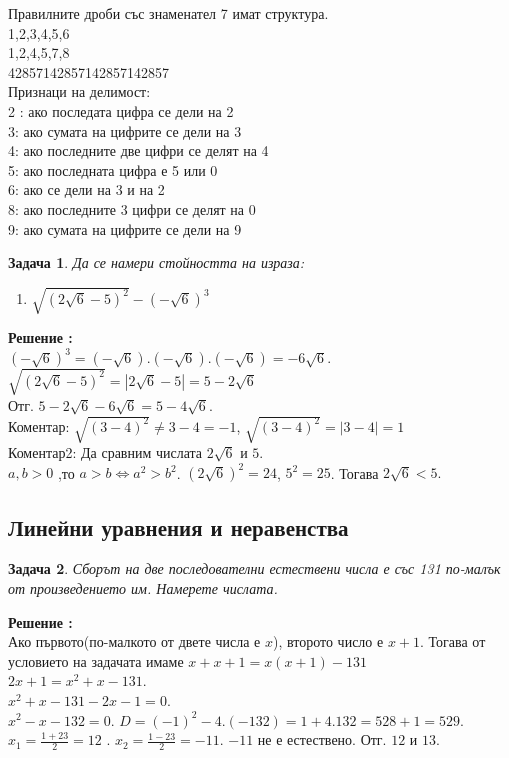 \documentclass{article}
\newtheorem{problem}{Задача}
\newcounter{solution}
\newcommand\solution{%
	\stepcounter{solution}%
	\textbf{Решение :}\\%
}
\begin{document}
\noindent
Правилните дроби със знаменател 7 имат структура. \\
1,2,3,4,5,6\\
1,2,4,5,7,8 \\
42857142857142857142857 \\
      
 
 Признаци на делимост:\\
 2 : ако последата цифра се дели на 2 \\
  3: ако сумата на цифрите се дели на 3 \\
 4: ако последните две цифри се делят на 4 \\
 5: ако последната цифра е 5 или 0 \\
 6: ако се дели на 3 и на 2 \\
 8: ако последните 3 цифри се делят на 0 \\
 9: ако сумата на цифрите се дели на 9
 \vspace{2cm}
 
\begin{problem}
Да се намери стойността на израза:
\begin{enumerate}
	\item $\sqrt{(2\sqrt{6} - 5 )^2} - (-\sqrt{6})^3$
\end{enumerate}	
\end{problem}
\solution

$ (-\sqrt{6})^3 =(-\sqrt{6}).(-\sqrt{6}).(-\sqrt{6}) = -6\sqrt{6}. $ \\
$\sqrt{(2\sqrt{6} - 5 )^2} = | 2\sqrt{6} - 5 | = 5 - 2\sqrt6$ \\
Отг. $ 5 - 2\sqrt 6 - 6\sqrt{6} = 5 - 4\sqrt{6} $. \\
Коментар: $\sqrt{(3-4)^2} \neq 3-4 = -1 $, $\sqrt{(3-4)^2} = | 3-4| = 1$  \\
Коментар2: Да сравним числата $2\sqrt6$ и $5.$ \\
$a,b >0 $ ,то $a>b \iff a^2 > b^2 $. 
$(2\sqrt 6)^2 = 24$, $5^2 = 25 $. Тогава  $2\sqrt6 < 5.$

\subsection{Линейни уравнения и неравенства}

\begin{problem}
	Сборът на две последователни естествени числа е със 131 по-малък от произведението им. Намерете числата.	
\end{problem}
\solution
 Ако първото(по-малкото от двете числа е $x$), второто число е $x+1$. Тогава от условието на задачата имаме 
 $ x + x+1 = x(x+1) - 131 $ \\ $2x + 1 = x^2 + x - 131.$ \\
 $x^2 + x - 131  -2x -1 = 0.$ \\
 $ x^2 -x -132 = 0.$
$D = (-1)^2 - 4.(-132) = 1 + 4.132 = 528+1 =529.$
$x_1 = \frac{1 +23}{2} = 12 $ . $x_2 = \frac{1 - 23}{2} = -11$. $-11$ не е естествено.
Отг. $12$ и $13$.
\end{document}
